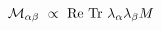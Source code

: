 \begin{equation}
{\cal M}_{\alpha\beta}\ \propto\ {\rm Re\ Tr}\ \lambda_\alpha\lambda_\beta M
\end{equation}

